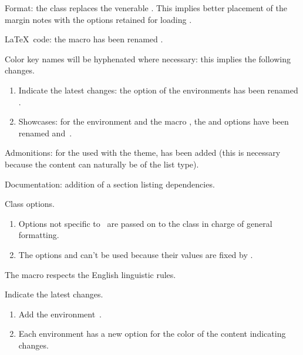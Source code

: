\documentclass{tutodoc}
\begin{document}
\small

\begin{tdocbreak}
	\item Format: the  class replaces the venerable . This implies better placement of the margin notes with the options retained for loading .

	\item \LaTeX\ code: the macro  has been renamed .

	\item Color key names will be hyphenated where necessary: this implies the following changes.
	\begin{enumerate}
		\item Indicate the latest changes: the  option of the environments has been renamed .

		\item Showcases: for the environment  and the macro , the  and   options have been renamed  and \,.
	\end{enumerate}
\end{tdocbreak}


\begin{tdocfix}
	\item Admonitions: for the  used with the  theme,  has been added (this is necessary because the content can naturally be of the list type).
\end{tdocfix}


\begin{tdocnew}
	\item Documentation: addition of a section listing dependencies.

	\item Class options.
	\begin{enumerate}
		\item Options not specific to \thisproj\ are passed on to the class in charge of general formatting.

		\item The  options  and  can't be used because their values are fixed by \thisproj.
	\end{enumerate}

	\item The macro  respects the English linguistic rules.

	\item Indicate the latest changes.
	\begin{enumerate}
		\item Add the environment \,.

		\item Each environment has a new option  for the color of the content indicating changes.
	\end{enumerate}
\end{tdocnew}
\end{document}
